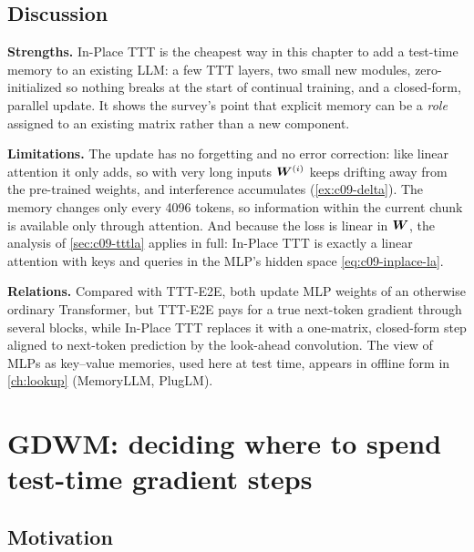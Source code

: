 \subsection{Discussion}

\textbf{Strengths.} In-Place TTT is the cheapest way in this chapter to add a test-time memory
to an existing LLM: a few TTT layers, two small new modules, zero-initialized so nothing breaks
at the start of continual training, and a closed-form, parallel update. It shows the survey's
point that explicit memory can be a \emph{role} assigned to an existing matrix rather than a new
component.

\textbf{Limitations.} The update has no forgetting and no error correction: like linear
attention it only adds, so with very long inputs $\bm{W}^{(i)}$ keeps drifting away from the
pre-trained weights, and interference accumulates (\cref{ex:c09-delta}). The memory changes
only every 4096 tokens, so information within the current chunk is available only through
attention. And because the loss is linear in $\bm{W}$, the analysis of \cref{sec:c09-tttla} applies
in full: In-Place TTT is exactly a linear attention with keys and queries in the MLP's hidden
space \eqref{eq:c09-inplace-la}.

\textbf{Relations.} Compared with TTT-E2E, both update MLP weights of an otherwise ordinary
Transformer, but TTT-E2E pays for a true next-token gradient through several blocks, while
In-Place TTT replaces it with a one-matrix, closed-form step aligned to next-token prediction
by the look-ahead convolution. The view of MLPs as key--value memories, used here at test time,
appears in offline form in \cref{ch:lookup} (MemoryLLM, PlugLM).

\section{GDWM: deciding where to spend test-time gradient steps}\label{sec:c09-gdwm}

\subsection{Motivation}


